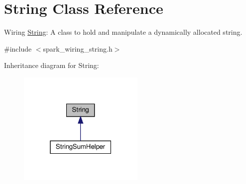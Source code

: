 \hypertarget{class_string}{}\section{String Class Reference}
\label{class_string}


Wiring \hyperlink{class_string}{String}\+: A class to hold and manipulate a dynamically allocated string.  




{\ttfamily \#include $<$spark\+\_\+wiring\+\_\+string.\+h$>$}



Inheritance diagram for String\+:\nopagebreak
\begin{figure}[H]
\begin{center}
\leavevmode
\includegraphics[width=171pt]{class_string__inherit__graph}
\end{center}
\end{figure}
